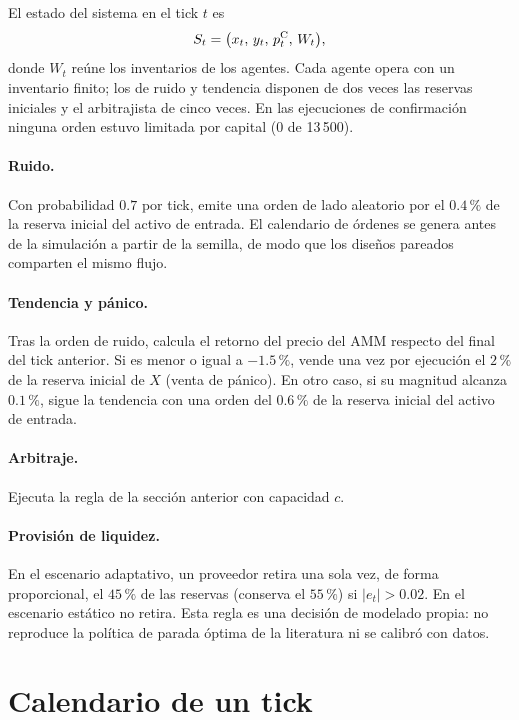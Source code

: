 El estado del sistema en el tick $t$ es
\begin{equation}
  S_t = \bigl(x_t,\,y_t,\,p^{\mathrm{C}}_t,\,W_t\bigr),
  \label{eq:estado}
\end{equation}
donde $W_t$ reúne los inventarios de los agentes. Cada agente opera con un inventario finito; los de ruido y tendencia disponen de dos veces las reservas iniciales y el arbitrajista de cinco veces. En las ejecuciones de confirmación ninguna orden estuvo limitada por capital (0 de 13\,500).

\paragraph{Ruido.} Con probabilidad $0.7$ por tick, emite una orden de lado aleatorio por el $0.4\,\%$ de la reserva inicial del activo de entrada. El calendario de órdenes se genera antes de la simulación a partir de la semilla, de modo que los diseños pareados comparten el mismo flujo.

\paragraph{Tendencia y pánico.} Tras la orden de ruido, calcula el retorno del precio del AMM respecto del final del tick anterior. Si es menor o igual a $-1.5\,\%$, vende una vez por ejecución el $2\,\%$ de la reserva inicial de $X$ (venta de pánico). En otro caso, si su magnitud alcanza $0.1\,\%$, sigue la tendencia con una orden del $0.6\,\%$ de la reserva inicial del activo de entrada.

\paragraph{Arbitraje.} Ejecuta la regla de la sección anterior con capacidad $c$.

\paragraph{Provisión de liquidez.} En el escenario adaptativo, un proveedor retira una sola vez, de forma proporcional, el $45\,\%$ de las reservas (conserva el $55\,\%$) si $|e_t|>0.02$. En el escenario estático no retira. Esta regla es una decisión de modelado propia: no reproduce la política de parada óptima de la literatura \cite{bergault2025exit} ni se calibró con datos.

\section{Calendario de un tick}

